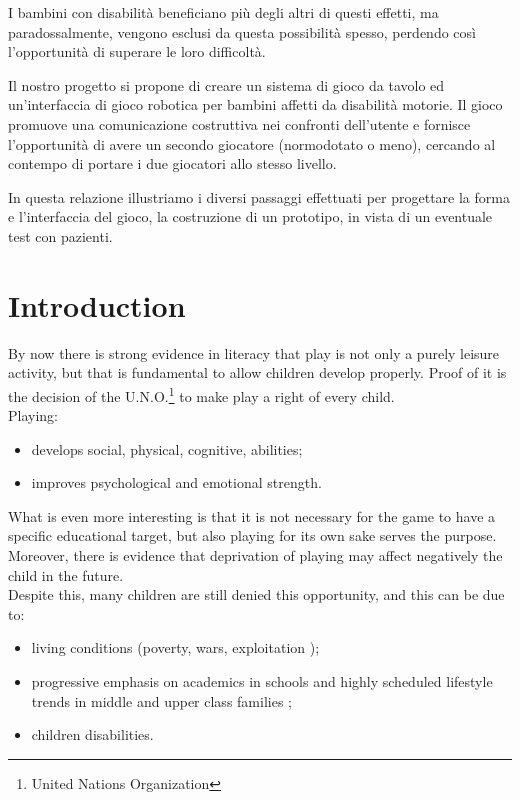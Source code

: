 \documentclass[a4paper,twoside]{book}
\begin{document}
I bambini con disabilit\`{a} beneficiano pi\`{u} degli altri di questi effetti, ma paradossalmente, vengono esclusi da questa possibilit\`{a} spesso, perdendo cos\`{i} l'opportunit\`{a} di superare le loro difficolt\`{a}.

Il nostro progetto si propone di creare un sistema di gioco da tavolo ed un'interfaccia di gioco robotica per bambini affetti da disabilit\`{a} motorie. Il gioco promuove una comunicazione costruttiva nei confronti dell'utente e fornisce l'opportunit\`{a} di avere un secondo giocatore (normodotato o meno), cercando al contempo di portare i due giocatori allo stesso livello.

In questa relazione illustriamo i diversi passaggi effettuati per progettare la forma e l'interfaccia del gioco, la costruzione di un prototipo, in vista di un eventuale test con pazienti.
 
\chapter{Introduction}

By now there is strong evidence in literacy that play is not only a purely leisure activity, but that is fundamental to allow children develop properly. Proof of it is the decision of the U.N.O.\footnote{United Nations Organization} to make play a right of every child. 
\\
Playing:
\begin{itemize}
\item develops social, physical, cognitive, abilities;
\item  improves psychological and emotional strength.
\end{itemize}

What is even more interesting is that it is not necessary for the game to have a specific educational target, but also playing for its own sake serves the purpose. Moreover, there is evidence that  deprivation of playing may affect negatively the child in the future.
\\
Despite this, many children are still denied this opportunity, and this can be due to:
\begin{itemize}
\item living conditions (poverty, wars, exploitation \textellipsis);
\item progressive emphasis on academics in schools and highly scheduled lifestyle trends in middle and upper class families \cite{art4};
\item children disabilities.
\end{itemize}
\end{document}
